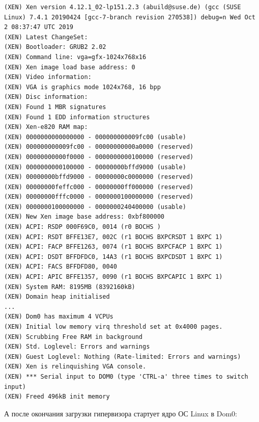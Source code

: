 \documentclass[14pt, a4paper]{article}
\begin{document}
\begin{lstlisting}
(XEN) Xen version 4.12.1_02-lp151.2.3 (abuild@suse.de) (gcc (SUSE Linux) 7.4.1 20190424 [gcc-7-branch revision 270538]) debug=n Wed Oct 2 08:37:47 UTC 2019
(XEN) Latest ChangeSet:
(XEN) Bootloader: GRUB2 2.02
(XEN) Command line: vga=gfx-1024x768x16
(XEN) Xen image load base address: 0
(XEN) Video information:
(XEN) VGA is graphics mode 1024x768, 16 bpp
(XEN) Disc information:
(XEN) Found 1 MBR signatures
(XEN) Found 1 EDD information structures
(XEN) Xen-e820 RAM map:
(XEN) 0000000000000000 - 000000000009fc00 (usable)
(XEN) 000000000009fc00 - 00000000000a0000 (reserved)
(XEN) 00000000000f0000 - 0000000000100000 (reserved)
(XEN) 0000000000100000 - 00000000bffd9000 (usable)
(XEN) 00000000bffd9000 - 00000000c0000000 (reserved)
(XEN) 00000000feffc000 - 00000000ff000000 (reserved)
(XEN) 00000000fffc0000 - 0000000100000000 (reserved)
(XEN) 0000000100000000 - 0000000240400000 (usable)
(XEN) New Xen image base address: 0xbf800000
(XEN) ACPI: RSDP 000F69C0, 0014 (r0 BOCHS )
(XEN) ACPI: RSDT BFFE13E7, 002C (r1 BOCHS BXPCRSDT 1 BXPC 1)
(XEN) ACPI: FACP BFFE1263, 0074 (r1 BOCHS BXPCFACP 1 BXPC 1)
(XEN) ACPI: DSDT BFFDFDC0, 14A3 (r1 BOCHS BXPCDSDT 1 BXPC 1)
(XEN) ACPI: FACS BFFDFD80, 0040
(XEN) ACPI: APIC BFFE1357, 0090 (r1 BOCHS BXPCAPIC 1 BXPC 1)
(XEN) System RAM: 8195MB (8392160kB)
(XEN) Domain heap initialised
...
(XEN) Dom0 has maximum 4 VCPUs
(XEN) Initial low memory virq threshold set at 0x4000 pages.
(XEN) Scrubbing Free RAM in background
(XEN) Std. Loglevel: Errors and warnings
(XEN) Guest Loglevel: Nothing (Rate-limited: Errors and warnings)
(XEN) Xen is relinquishing VGA console.
(XEN) *** Serial input to DOM0 (type 'CTRL-a' three times to switch input)
(XEN) Freed 496kB init memory
\end{lstlisting}

А после окончания загрузки гипервизора стартует ядро ОС Linux в Dom0:
\end{document}
